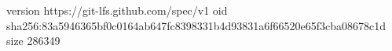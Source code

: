 version https://git-lfs.github.com/spec/v1
oid sha256:83a5946365bf0c0164ab647fc8398331b4d93831a6f66520e65f3cba08678c1d
size 286349
